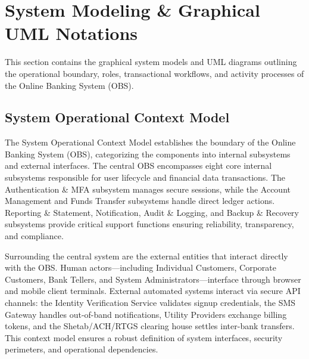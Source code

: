 \documentclass[11pt,a4paper]{article}
\begin{document}
\newpage

\section{System Modeling \& Graphical UML Notations}

This section contains the graphical system models and UML diagrams outlining the operational boundary, roles, transactional workflows, and activity processes of the Online Banking System (OBS).

\subsection{System Operational Context Model}
The System Operational Context Model establishes the boundary of the Online Banking System (OBS), categorizing the components into internal subsystems and external interfaces. The central OBS encompasses eight core internal subsystems responsible for user lifecycle and financial data transactions. The Authentication \& MFA subsystem manages secure sessions, while the Account Management and Funds Transfer subsystems handle direct ledger actions. Reporting \& Statement, Notification, Audit \& Logging, and Backup \& Recovery subsystems provide critical support functions ensuring reliability, transparency, and compliance.

Surrounding the central system are the external entities that interact directly with the OBS. Human actors—including Individual Customers, Corporate Customers, Bank Tellers, and System Administrators—interface through browser and mobile client terminals. External automated systems interact via secure API channels: the Identity Verification Service validates signup credentials, the SMS Gateway handles out-of-band notifications, Utility Providers exchange billing tokens, and the Shetab/ACH/RTGS clearing house settles inter-bank transfers. This context model ensures a robust definition of system interfaces, security perimeters, and operational dependencies.
\end{document}

